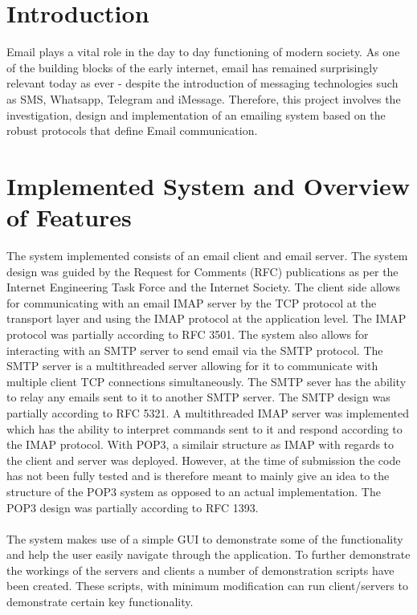 \documentclass[11pt]{article}
\begin{document}
\begin{multicols}{2}
\section{Introduction}
Email plays a vital role in the day to day functioning of modern society. As one of the building blocks of the early internet, email has remained surprisingly relevant today as ever - despite the introduction of messaging technologies such as SMS, Whatsapp, Telegram and iMessage. Therefore, this project involves the investigation, design and implementation of an emailing system based on the robust protocols that define Email communication.
\section{Implemented System and Overview of Features}
The system implemented consists of an email client and email server.  The system design was guided by the Request for Comments (RFC) publications as per the Internet Engineering Task Force and the Internet Society. The client side allows for communicating with an email IMAP server by the TCP protocol at the transport layer and using the IMAP protocol at the application level. The IMAP protocol was partially according to RFC 3501. The system also allows for interacting with an SMTP server to send email via the SMTP protocol. The SMTP server is a multithreaded server allowing for it to communicate with multiple client TCP connections simultaneously. The SMTP sever has the ability to relay any emails sent to it to another SMTP server. The SMTP design  was partially according to RFC 5321. A multithreaded IMAP server was implemented which has the ability to interpret commands sent to it and respond according to the IMAP protocol. With POP3, a similair structure as IMAP with regards to the client and server was deployed. However, at the time of submission the code has not been fully tested and is therefore meant to mainly give an idea to the structure of the POP3 system as opposed to an actual implementation. The POP3 design was partially according to RFC 1393.
\\\\
The system  makes use of a simple GUI to demonstrate some of the functionality and help the user easily navigate through the application. To further demonstrate the workings of the servers and clients a number of demonstration scripts have been created. These scripts, with minimum modification can run client/servers to demonstrate certain key functionality.

\end{multicols}
\end{document}
